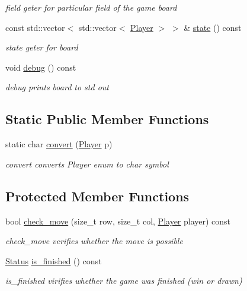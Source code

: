 \begin{DoxyCompactItemize}
\begin{DoxyCompactList}\small\item\em field geter for particular field of the game board \end{DoxyCompactList}\item 
const std\+::vector$<$ std\+::vector$<$ \hyperlink{common__defs_8h_a9c8780378078e51e7c9041cbac392db9}{Player} $>$ $>$ \& \hyperlink{class_tic_tac_toe_a2bd8a25c0a5885b76ac84a201751b307}{state} () const
\begin{DoxyCompactList}\small\item\em state geter for board \end{DoxyCompactList}\item 
void \hyperlink{class_tic_tac_toe_a3b71a1e724f9af69d0fb8ba3dd848942}{debug} () const
\begin{DoxyCompactList}\small\item\em debug prints board to std out \end{DoxyCompactList}\end{DoxyCompactItemize}
\subsection*{Static Public Member Functions}
\begin{DoxyCompactItemize}
\item 
static char \hyperlink{class_tic_tac_toe_a829574b09a8672b4fb65d4a7cfeba83e}{convert} (\hyperlink{common__defs_8h_a9c8780378078e51e7c9041cbac392db9}{Player} p)
\begin{DoxyCompactList}\small\item\em convert converts Player enum to char symbol \end{DoxyCompactList}\end{DoxyCompactItemize}
\subsection*{Protected Member Functions}
\begin{DoxyCompactItemize}
\item 
bool \hyperlink{class_tic_tac_toe_a8495d66a8662f19b33be04e41da9a133}{check\+\_\+move} (size\+\_\+t row, size\+\_\+t col, \hyperlink{common__defs_8h_a9c8780378078e51e7c9041cbac392db9}{Player} player) const
\begin{DoxyCompactList}\small\item\em check\+\_\+move verifies whether the move is possible \end{DoxyCompactList}\item 
\hyperlink{common__defs_8h_a67a0db04d321a74b7e7fcfd3f1a3f70b}{Status} \hyperlink{class_tic_tac_toe_a592cbbdeee049391313a0712ca12589c}{is\+\_\+finished} () const
\begin{DoxyCompactList}\small\item\em is\+\_\+finished virifies whether the game was finished (win or drawn) \end{DoxyCompactList}\end{DoxyCompactItemize}
